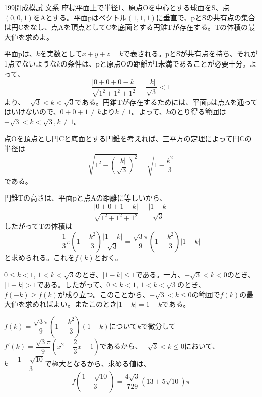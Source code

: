 \begin{prob}{199}{}{開成模試 文系}
 座標平面上で半径1、原点Oを中心とする球面をS、点$(0,0,1)$をAとする。平面pはベクトル$(1,1,1)$に垂直で、pとSの共有点の集合は円Cをなし、点Aを頂点としてCを底面とする円錐Tが存在する。Tの体積の最大値を求めよ。
\end{prob}

平面pは、$k$を実数として$x+y+z=k$で表される。pとSが共有点を持ち、それが1点でないような$k$の条件は、pと原点Oの距離が1未満であることが必要十分。よって、
\[ \frac{|0+0+0-k|}{\sqrt{1^2+1^2+1^2}}=\frac{|k|}{\sqrt{3}} < 1 \]
より、$-\sqrt{3}<k<\sqrt{3}$である。円錐Tが存在するためには、平面pは点Aを通ってはいけないので、$0+0+1\neq k$より$k\neq 1$。よって、$k$のとり得る範囲は$-\sqrt{3}<k<\sqrt{3}, k\neq 1$。

点Oを頂点とし円Cと底面とする円錐を考えれば、三平方の定理によって円Cの半径は
\[ \sqrt{1^2-\left(\frac{|k|}{\sqrt{3}}\right)^2} = \sqrt{1-\frac{k^2}{3}} \]
である。

円錐Tの高さは、平面pと点Aの距離に等しいから、
\[ \frac{|0+0+1-k|}{\sqrt{1^2+1^2+1^2}}=\frac{|1-k|}{\sqrt{3}} \]
したがってTの体積は
\[ \frac{1}{3}\pi \left(1-\frac{k^2}{3}\right) \frac{|1-k|}{\sqrt{3}} = \frac{\sqrt{3}\pi}{9}\left(1-\frac{k^2}{3}\right)|1-k| \]
と求められる。これを$f(k)$とおく。

$0\le k < 1$, $1<k<\sqrt{3}$のとき、$|1-k|\le 1$である。一方、$-\sqrt{3}<k<0$のとき、$|1-k|>1$である。したがって、$0\le k<1$, $1<k<\sqrt{3}$のとき、$f(-k)\ge f(k)$が成り立つ。このことから、$-\sqrt{3}<k\le 0$の範囲で$f(k)$の最大値を求めればよい。またこのとき$|1-k|=1-k$である。

$f(k)=\dfrac{\sqrt{3}\pi}{9}\left(1-\dfrac{k^2}{3}\right)(1-k)$について$k$で微分して$f'(k)=\dfrac{\sqrt{3}\pi}{9}\left(x^2-\dfrac{2}{3}x-1\right)$であるから、$-\sqrt{3}<k\le 0$において、$k=\dfrac
{1-\sqrt{10}}{3}$で極大となるから、求める値は、
\[ f\left(\frac{1-\sqrt{10}}{3}\right) = \frac{4\sqrt{3}}{729}(13+5\sqrt{10})\pi \]